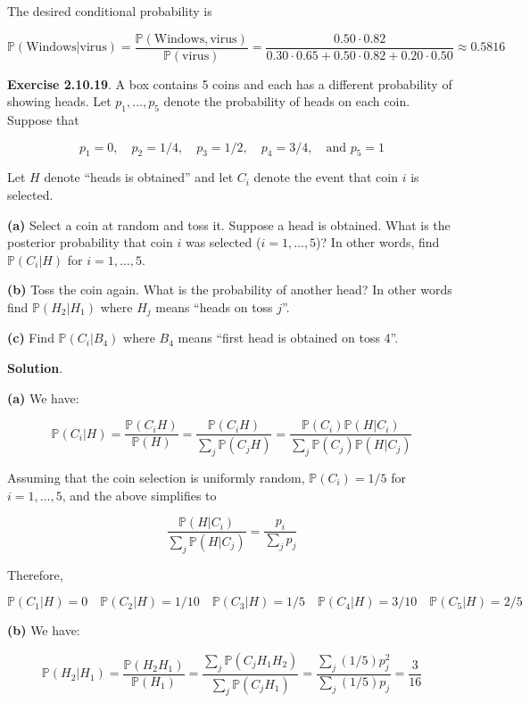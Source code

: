 The desired conditional probability is

\[ \mathbb{P}(\text{Windows} | \text{virus}) = \frac{\mathbb{P}(\text{Windows}, \text{virus})}{\mathbb{P}(\text{virus})}
= \frac{0.50 \cdot 0.82}{0.30 \cdot 0.65 + 0.50 \cdot 0.82 + 0.20 \cdot 0.50} \approx 0.5816
\]

\textbf{Exercise 2.10.19}. A box contains 5 coins and each has a
different probability of showing heads. Let \(p_1, \dots, p_5\) denote
the probability of heads on each coin. Suppose that

\[ p_1 = 0, \quad p_2 = 1/4, \quad p_3 = 1/2, \quad p_4 = 3/4, \quad \text{and } p_5 = 1\]

Let \(H\) denote ``heads is obtained'' and let \(C_i\) denote the event
that coin \(i\) is selected.

\textbf{(a)} Select a coin at random and toss it. Suppose a head is
obtained. What is the posterior probability that coin \(i\) was selected
(\(i = 1, \dots, 5\))? In other words, find \(\mathbb{P}(C_i | H)\) for
\(i = 1, \dots, 5\).

\textbf{(b)} Toss the coin again. What is the probability of another
head? In other words find \(\mathbb{P}(H_2 | H_1)\) where \(H_j\) means
``heads on toss \(j\)''.

\textbf{(c)} Find \(\mathbb{P}(C_i | B_4)\) where \(B_4\) means ``first
head is obtained on toss 4''.

\textbf{Solution}.

\textbf{(a)} We have:

\[ \mathbb{P}(C_i | H) = \frac{\mathbb{P}(C_i H)}{\mathbb{P}(H)} = \frac{\mathbb{P}(C_i H)}{\sum_j \mathbb{P}(C_j H)} = \frac{\mathbb{P}(C_i)\mathbb{P}(H | C_i)}{ \sum_j \mathbb{P}(C_j)\mathbb{P}(H | C_j)}\]

Assuming that the coin selection is uniformly random,
\(\mathbb{P}(C_i) = 1/5\) for \(i = 1, \dots, 5\), and the above
simplifies to

\[ \frac{\mathbb{P}(H | C_i)}{ \sum_j \mathbb{P}(H | C_j)} = \frac{p_i}{\sum_j p_j}\]

Therefore,

\[ \mathbb{P}(C_1 | H) = 0
\quad
\mathbb{P}(C_2 | H) = 1/10
\quad
\mathbb{P}(C_3 | H) = 1/5
\quad
\mathbb{P}(C_4 | H) = 3/10
\quad
\mathbb{P}(C_5 | H) = 2/5
\]

\textbf{(b)} We have:

\[ \mathbb{P}(H_2 | H_1) = \frac{\mathbb{P}(H_2 H_1) }{\mathbb{P}(H_1) } = \frac{\sum_j \mathbb{P}(C_j H_1 H_2)}{\sum_j \mathbb{P}(C_j H_1)} = \frac{\sum_j (1/5) p_j^2}{\sum_j (1/5) p_j} = \frac{3}{16} \]

